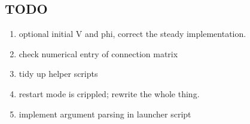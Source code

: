 \documentclass[12pt,a4paper]{article}
\begin{document}
\subsection{TODO}
\begin{enumerate}
\item optional initial V and phi, correct the steady implementation.
\item check numerical entry of connection matrix
\item tidy up helper scripts
\item restart mode is crippled; rewrite the whole thing.
\item implement argument parsing in launcher script
\end{enumerate}
\end{document}
